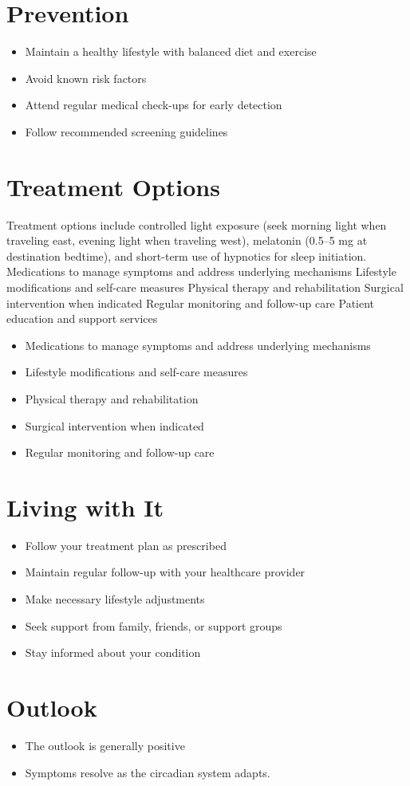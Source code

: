 \section{Prevention}
\begin{itemize}[noitemsep]
  \item Maintain a healthy lifestyle with balanced diet and exercise
  \item Avoid known risk factors
  \item Attend regular medical check-ups for early detection
  \item Follow recommended screening guidelines
\end{itemize}
\section{Treatment Options}
Treatment options include controlled light exposure (seek morning light when traveling east, evening light when traveling west), melatonin (0.5--5 mg at destination bedtime), and short-term use of hypnotics for sleep initiation. Medications to manage symptoms and address underlying mechanisms Lifestyle modifications and self-care measures Physical therapy and rehabilitation Surgical intervention when indicated Regular monitoring and follow-up care Patient education and support services

\begin{itemize}[noitemsep]
  \item Medications to manage symptoms and address underlying mechanisms
  \item Lifestyle modifications and self-care measures
  \item Physical therapy and rehabilitation
  \item Surgical intervention when indicated
  \item Regular monitoring and follow-up care
\end{itemize}
\section{Living with It}
\begin{itemize}[noitemsep]
  \item Follow your treatment plan as prescribed
  \item Maintain regular follow-up with your healthcare provider
  \item Make necessary lifestyle adjustments
  \item Seek support from family, friends, or support groups
  \item Stay informed about your condition
\end{itemize}
\section{Outlook}
\begin{itemize}[noitemsep]
  \item The outlook is generally positive
  \item Symptoms resolve as the circadian system adapts.
\end{itemize}
